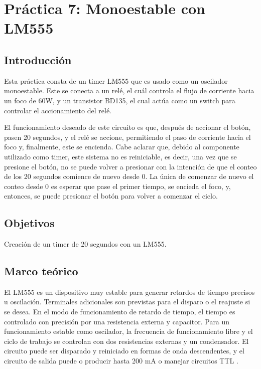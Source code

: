 \clearpage

\section{Práctica 7: Monoestable con LM555}

\subsection{Introducción}

Esta práctica consta de un timer LM555 que es usado como un oscilador monoestable. Este se conecta a un relé, el cuál controla el flujo de corriente hacia un foco de 60W, y un transistor BD135, el cual actúa como un switch para controlar el accionamiento del relé.

El funcionamiento deseado de este circuito es que, después de accionar el botón, pasen 20 segundos, y el relé se accione, permitiendo el paso de corriente hacia el foco y, finalmente, este se encienda. Cabe aclarar que, debido al componente utilizado como timer, este sistema no es reiniciable, es decir, una vez que se presione el botón, no se puede volver a presionar con la intención de que el conteo de los 20 segundos comience de nuevo desde 0. La única de comenzar de nuevo el conteo desde 0 es esperar que pase el primer tiempo, se encieda el foco, y, entonces, se puede presionar el botón para volver a comenzar el ciclo.

\subsection{Objetivos}

Creación de un timer de 20 segundos con un LM555.

\subsection{Marco teórico}

El LM555 es un dispositivo muy estable para generar retardos de tiempo precisos u oscilación. Terminales adicionales son previstas para el disparo o el reajuste si se desea. En el modo de funcionamiento de retardo de tiempo, el tiempo es controlado con precisión por una resistencia externa y capacitor. Para un funcionamiento estable como oscilador, la frecuencia de funcionamiento libre y el ciclo de trabajo se controlan con dos resistencias externas y un condensador. El circuito puede ser disparado y reiniciado en formas de onda descendentes, y el circuito de salida puede o producir hasta 200 mA o manejar circuitos TTL \parencite{texas_instruments_lm555_2015}.

